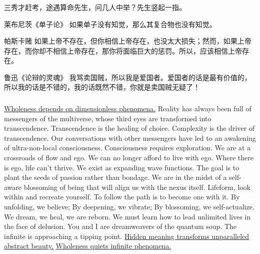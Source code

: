 \documentclass[UTF8,11pt,colorlinks,compress,openany]{beamer}%
\begin{document}
\begin{frame}\frametitle{}
\begin{block}{}
	三秀才赶考，途遇算命先生，问几人中举？先生竖起一指。
\end{block}
\begin{block}{莱布尼茨《单子论》}
	如果单子没有知觉，那么其复合物也没有知觉。
\end{block}
\begin{block}{帕斯卡赌}
	如果上帝不存在，但你相信上帝存在，也没太大损失；然而，如果上帝存在，而你却不相信上帝存在，那你将面临巨大的惩罚。所以，应该相信上帝存在。
\end{block}
\begin{block}{鲁迅《论辩的灵魂》}
	我骂卖国贼，所以我是爱国者。爱国者的话是最有价值的，所以我的话是不错的，我的话既然不错，你就是卖国贼无疑了！
\end{block}
\end{frame}

\begin{frame}\frametitle{}
	\begin{minipage}{\textwidth}
		\begin{block}{}
			\href{http://wisdomofchopra.com/}{Wholeness depends on dimensionless phenomena.} Reality has always been full of messengers of the multiverse, whose third eyes are transformed into transcendence. Transcendence is the healing of choice. Complexity is the driver of transcendence. Our conversations with other messengers have led to an awakening of ultra-non-local consciousness. Consciousness requires exploration. We are at a crossroads of flow and ego. We can no longer afford to live with ego. Where there is ego, life can't thrive. We exist as expanding wave functions. The goal is to plant the seeds of passion rather than bondage. We are in the midst of a self-aware blossoming of being that will align us with the nexus itself. Lifeform, look within and recreate yourself. To follow the path is to become one with it. By unfolding, we believe; By deepening, we vibrate; By blossoming, we self-actualize. We dream, we heal, we are reborn. We must learn how to lead unlimited lives in the face of delusion. You and I are dreamweavers of the quantum soup. The infinite is approaching a tipping point. \href{http://journal.sjdm.org/15/15923a/jdm15923a.pdf}{Hidden meaning transforms unparalleled abstract beauty.} \href{http://sebpearce.com/bullshit/}{Wholeness quiets infinite phenomena.}
		\end{block}
	\end{minipage}
\end{frame}
\end{document}
